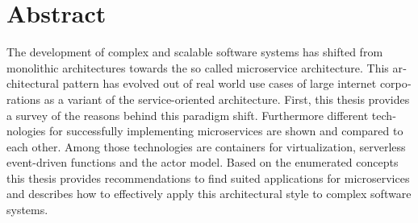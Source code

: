 \chapter{Abstract}

\begin{english} %

The development of complex and scalable software systems has shifted from monolithic architectures towards the so called microservice architecture. This architectural pattern has evolved out of real world use cases of large internet corporations as a variant of the service-oriented architecture. First, this thesis provides a survey of the reasons behind this paradigm shift. Furthermore different technologies for successfully implementing microservices are shown and compared to each other. Among those technologies are containers for virtualization, serverless event-driven functions and the actor model. Based on the enumerated concepts this thesis provides recommendations to find suited applications for microservices and describes how to effectively apply this architectural style to complex software systems.

\end{english}
